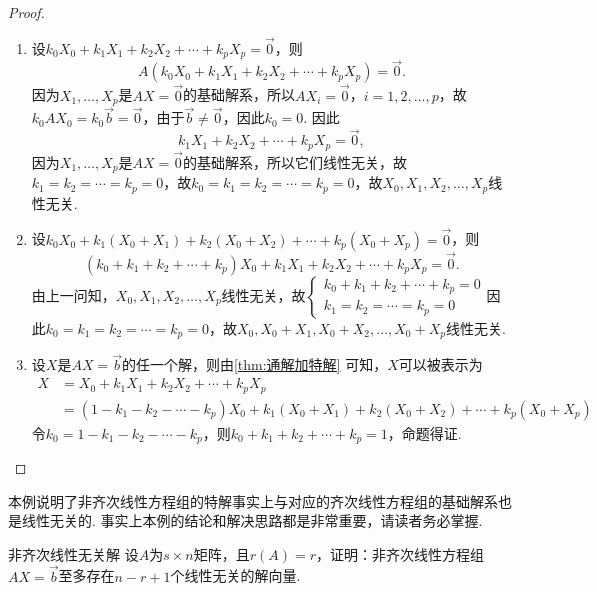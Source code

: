 \begin{proof}
    \begin{enumerate}
        \item 设$k_0X_0+k_1X_1+k_2X_2+\cdots+k_pX_p=\vec{0}$，则
              \[A(k_0X_0+k_1X_1+k_2X_2+\cdots+k_pX_p)=\vec{0}.\]
              因为$X_1,\ldots,X_p$是$AX=\vec{0}$的基础解系，所以$AX_i=\vec{0}$，$i=1,2,\ldots,p$，故$k_0AX_0=k_0\vec{b}=\vec{0}$，由于$\vec{b}\neq \vec{0}$，因此$k_0=0$. 因此
              \[k_1X_1+k_2X_2+\cdots+k_pX_p=\vec{0},\]
              因为$X_1,\ldots,X_p$是$AX=\vec{0}$的基础解系，所以它们线性无关，故$k_1=k_2=\cdots=k_p=0$，故$k_0=k_1=k_2=\cdots=k_p=0$，故$X_0,X_1,X_2,\ldots,X_p$线性无关.

        \item 设$k_0X_0+k_1(X_0+X_1)+k_2(X_0+X_2)+\cdots+k_p(X_0+X_p)=\vec{0}$，则
              \[(k_0+k_1+k_2+\cdots+k_p)X_0+k_1X_1+k_2X_2+\cdots+k_pX_p=\vec{0}.\]
              由上一问知，$X_0,X_1,X_2,\ldots,X_p$线性无关，故$\begin{cases}
                      k_0+k_1+k_2+\cdots+k_p=0 \\
                      k_1=k_2=\cdots=k_p=0
                  \end{cases}$因此$k_0=k_1=k_2=\cdots=k_p=0$，故$X_0,X_0+X_1,X_0+X_2,\ldots,X_0+X_p$线性无关.

        \item 设$X$是$AX=\vec{b}$的任一个解，则由\autoref{thm:通解加特解} 可知，$X$可以被表示为
              \begin{align*}
                  X & =X_0+k_1X_1+k_2X_2+\cdots+k_pX_p                                         \\
                    & =(1-k_1-k_2-\cdots-k_p)X_0+k_1(X_0+X_1)+k_2(X_0+X_2)+\cdots+k_p(X_0+X_p)
              \end{align*}
              令$k_0=1-k_1-k_2-\cdots-k_p$，则$k_0+k_1+k_2+\cdots+k_p=1$，命题得证.
    \end{enumerate}
\end{proof}

本例说明了非齐次线性方程组的特解事实上与对应的齐次线性方程组的基础解系也是线性无关的. 事实上本例的结论和解决思路都是非常重要，请读者务必掌握.

\begin{example}{}{非齐次线性无关解}
    设$A$为$s \times n$矩阵，且$r(A)=r$，证明：非齐次线性方程组$AX=\vec{b}$至多存在$n-r+1$个线性无关的解向量.
\end{example}

